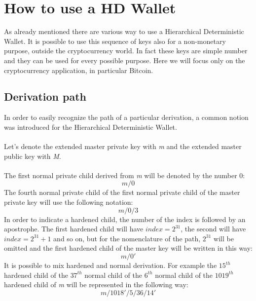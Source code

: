 
\chapter{How to use a HD Wallet} %

\label{howto} %



As already mentioned there are various way to use a Hierarchical Deterministic Wallet. It is possible to use this sequence of keys also for a non-monetary purpose, outside the cryptocurrency world. In fact these keys are simple number and they can be used for every possible purpose. Here we will focus only on the cryptocurrency application, in particular Bitcoin.

\section{Derivation path}
In order to easily recognize the path of a particular derivation, a common notion was introduced for the Hierarchical Deterministic Wallet.
\\ \\
Let's denote the extended master private key with \textit{m} and the extended master public key with \textit{M}.
\\ \\
The first normal private child derived from \textit{m} will be denoted by the number $0$:
\begin{equation*}
m /0
\end{equation*}
The fourth normal private child of the first normal private child of the master private key will use the following notation:
\begin{equation*}
m /0/3
\end{equation*}
In order to indicate a hardened child, the number of the index is followed by an apostrophe. The first hardened child will have $index=2^{31}$, the second will have $index=2^{31}+1$ and so on, but for the nomenclature of the path, $2^{31}$ will be omitted and the first hardened child of the master key will be written in this way: 
\begin{equation*}
m /0' 
\end{equation*}
It is possible to mix hardened and normal derivation. For example the $15^{th}$ hardened child of the $37^{th}$ normal child of the $6^{th}$ normal child of the $1019^{th}$ hardened child of \textit{m} will be represented in the following way:
\begin{equation*}
m /1018'/5/36/14'
\end{equation*}

